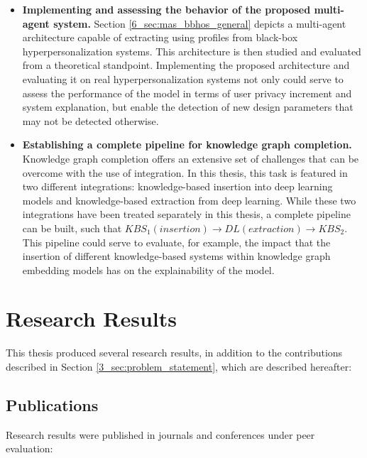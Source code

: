 \begin{itemize}
\begin{itemize}
    \end{itemize}
    \item \textbf{Implementing and assessing the behavior of the proposed multi-agent system.} Section \ref{6_sec:mas_bbhos_general} depicts a multi-agent architecture capable of extracting using profiles from black-box hyperpersonalization systems. This architecture is then studied and evaluated from a theoretical standpoint. Implementing the proposed architecture and evaluating it on real hyperpersonalization systems not only could serve to assess the performance of the model in terms of user privacy increment and system explanation, but enable the detection of new design parameters that may not be detected otherwise.
    
    \item \textbf{Establishing a complete pipeline for knowledge graph completion.} Knowledge graph completion offers an extensive set of challenges that can be overcome with the use of integration. In this thesis, this task is featured in two different integrations: knowledge-based insertion into deep learning models and knowledge-based extraction from deep learning. While these two integrations have been treated separately in this thesis, a complete pipeline can be built, such that $KBS_{1} (insertion)\rightarrow DL (extraction)\rightarrow KBS_{2}$. This pipeline could serve to evaluate, for example, the impact that the insertion of different knowledge-based systems within knowledge graph embedding models has on the explainability of the model.
\end{itemize}



\section{Research Results}\label{7_sec:research_results}
This thesis produced several research results, in addition to the contributions described in Section \ref{3_sec:problem_statement}, which are described hereafter:
\subsection{Publications}
Research results were published in journals and conferences under peer evaluation: 
